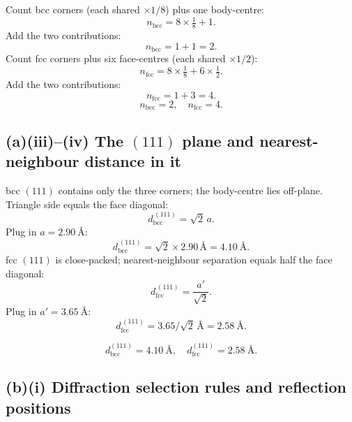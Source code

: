 \documentclass[11pt]{article}
\begin{document}
Count bcc corners (each shared $\times 1/8$) plus one body-centre:
\[
n_{\mathrm{bcc}} = 8\times\tfrac{1}{8} + 1.
\]
Add the two contributions:
\[
n_{\mathrm{bcc}} = 1 + 1 = 2.
\]
Count fcc corners plus six face-centres (each shared $\times 1/2$):
\[
n_{\mathrm{fcc}} = 8\times\tfrac{1}{8} + 6\times\tfrac{1}{2}.
\]
Add the two contributions:
\[
n_{\mathrm{fcc}} = 1 + 3 = 4.
\]
\[
\boxed{\ n_{\mathrm{bcc}}=2,\quad n_{\mathrm{fcc}}=4.\ }
\]

\subsection*{(a)(iii)--(iv) The $(111)$ plane and nearest-neighbour distance in it}

bcc $(111)$ contains only the three corners; the body-centre lies off-plane. Triangle side equals the face diagonal:
\[
d^{\,(111)}_{\mathrm{bcc}} = \sqrt{2}\,a.
\]
Plug in $a=\SI{2.90}{\angstrom}$:
\[
d^{\,(111)}_{\mathrm{bcc}} = \sqrt{2}\times 2.90\,\si{\angstrom} = \SI{4.10}{\angstrom}.
\]
fcc $(111)$ is close-packed; nearest-neighbour separation equals half the face diagonal:
\[
d^{\,(111)}_{\mathrm{fcc}} = \frac{a'}{\sqrt 2}.
\]
Plug in $a'=\SI{3.65}{\angstrom}$:
\[
d^{\,(111)}_{\mathrm{fcc}} = 3.65/\sqrt{2}\,\si{\angstrom} = \SI{2.58}{\angstrom}.
\]

\begin{center}
\end{center}

\[
\boxed{\ d_{\mathrm{bcc}}^{(111)}=\SI{4.10}{\angstrom},\quad d_{\mathrm{fcc}}^{(111)}=\SI{2.58}{\angstrom}.\ }
\]

\subsection*{(b)(i) Diffraction selection rules and reflection positions}
\end{document}
